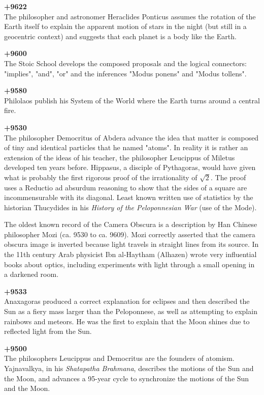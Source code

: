\textbf{+9622}\\
The philosopher and astronomer Heraclides Ponticus assumes the rotation of the Earth itself to explain the apparent motion of stars in the night (but still in a geocentric context) and suggests that each planet is a body like the Earth.

\textbf{+9600}\\
The Stoic School develops the composed proposals and the logical connectors: "implies", "and", "or" and the inferences "Modus ponens" and "Modus tollens".

\textbf{+9580}\\
Philolaos publish his System of the World where the Earth turns around a central fire.

\textbf{+9530}\\
The philosopher Democritus of Abdera advance the idea that matter is composed of tiny and identical particles that he named "atoms". In reality it is rather an extension of the ideas of his teacher, the philosopher Leucippus of Miletus developed ten years before. Hippasus, a disciple of Pythagoras, would have given what is probably the first rigorous proof of the irrationality of $\sqrt{2}$. The proof uses a Reductio ad absurdum reasoning to show that the sides of a square are incommensurable with its diagonal. Least known written use of statistics by the historian Thucydides in his \textit{History of the Peloponnesian War} (use of the Mode).

The oldest known record of the Camera Obscura is a description by Han Chinese philosopher Mozi (ca. 9530 to ca. 9609).  Mozi correctly asserted that the camera obscura image is inverted because light travels in straight lines from its source. In the 11th century Arab physicist Ibn al-Haytham (Alhazen) wrote very influential books about optics, including experiments with light through a small opening in a darkened room.

\textbf{+9533}\\
Anaxagoras produced a correct explanation for eclipses and then described the Sun as a fiery mass larger than the Peloponnese, as well as attempting to explain rainbows and meteors. He was the first to explain that the Moon shines due to reflected light from the Sun.

\textbf{+9500}\\
The philosophers Leucippus and Democritus are the founders of atomism. Yajnavalkya, in his \textit{Shatapatha Brahmana}, describes the motions of the Sun and the Moon, and advances a 95-year cycle to synchronize the motions of the Sun and the Moon. 

